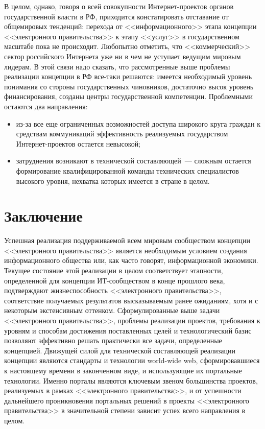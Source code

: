 \begin{multicols}{2}
В целом, однако, говоря о всей совокупности Интернет-проектов органов государственной
влас\-ти в РФ, приходится констатировать отставание от общемировых тенденций:
перехода от <<информационного>> этапа концепции <<электронного правительства>> к
этапу <<услуг>> в государственном масштабе пока не происходит. Любопытно отметить,
что <<коммерческий>> сектор российского Интернета уже ни в чем не уступает ведущим
мировым лидерам. В этой связи надо сказать, что рассмотренные выше проблемы
реализации концепции в РФ все-таки решаются: имеется необходимый уровень
понимания со стороны государственных чиновников, достаточно высок уровень
финансирования, созданы центры государственной компетенции. Проблемными остаются
два направления:
\begin{itemize}
\item из-за все еще ограниченных возможностей досту\-па широкого круга граждан к
средст\-вам коммуникаций эффективность реализуемых
государством
Ин\-тер\-нет-про\-ек\-тов остается не\-вы\-сокой;
\item затруднения возникают в технической со\-став\-ля\-ющей~--- сложным остается
формирование квалифицированной команды технических специалистов высокого
уровня, нехватка которых имеется в стране в целом.
\end{itemize}

\section*{Заключение}

Успешная реализация поддерживаемой всем мировым сообществом концепции
<<электронного правительства>> является необходимым условием создания
информационного общества или, как час\-то говорят, информационной экономики.
Текущее состояние этой реализации в целом соответствует этапности, определенной для
концепции ИТ-со\-об\-ще\-ст\-вом в конце прошлого века,
подтверждают жизнеспособность
<<электронного правительства>>, соответствие получаемых результатов высказываемым
ранее ожиданиям, хотя и с некоторым экстенсивным оттенком. Сформулированные выше
задачи <<электронного правительства>>, проблемы реализации проектов, требования к
уровням и способам достижения поставленных целей и технологический базис позволяют
эффективно решать практически все задачи, определенные концепцией. Движущей силой
для технической составляющей реализации концепции
 являются стандарты и технологии
{\sf world-wide web}, сформировавшиеся к настоящему времени в законченном виде, и
использующие их портальные технологии. Именно порталы являются ключевым звеном
большинства проектов, реализуемых в рамках <<электронного правительства>>, и от
успешности дальнейшего проникновения портальных решений в проекты <<электронного
правительства>> в значительной степени зависит успех всего направления в целом.


\end{multicols}
